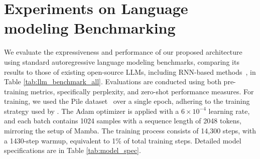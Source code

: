\documentclass{article} %
\begin{document}
\section{Experiments on Language modeling Benchmarking} \label{appedix:model_spec}
We evaluate the expressiveness and performance of our proposed architecture using standard autoregressive language modeling benchmarks, comparing its results to those of existing open-source LLMs, including RNN-based methods~\citep{peng2023rwkv,mamba}, in Table \ref{tab:llm_benchmark_all}. 
Evaluations are conducted using both pre-training metrics, specifically perplexity, and zero-shot performance measures. For training, we used the Pile dataset~\citep{gao2020pile} over a single epoch, adhering to the training strategy used by \citet{biderman2023pythia}. The Adam optimizer is applied with a $6 \times 10^{-4}$ learning rate, and each batch contains 1024 samples with a sequence length of 2048 tokens, mirroring the setup of Mamba. The training process consists of 14,300 steps, with a 1430-step warmup, equivalent to 1\% of total training steps. Detailed model specifications are in Table \ref{tab:model_spec}. 
\end{document}
